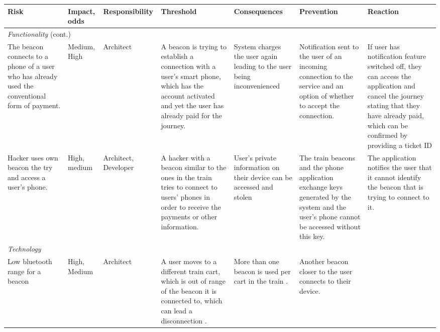 {
\renewcommand{\arraystretch}{1.2}
  \begin{sidewaystable}
    \begin{tabularx}{\textwidth}{XXXXXXX}
      \textbf{Risk} & \textbf{Impact, odds} & \textbf{Responsibility} & \textbf{Threshold} & \textbf{Consequences} & \textbf{Prevention} & \textbf{Reaction} \\ \hline
      \multicolumn{7}{l}{\textit{Functionality} (cont.)} \\ \hline
      The beacon connects to a phone of a user who has already used the conventional form of payment. & Medium, High & Architect & A beacon is trying to establish a connection with a user's smart phone, which has the account activated and yet the user has already paid for the journey. & System charges the user again leading to the user being inconvenienced & Notification sent to the user of an incoming connection to the service and an option of whether to accept the connection. & If user has notification feature switched off, they can access the application and cancel the journey stating that they have already paid, which can be confirmed by providing a ticket ID \\ \hline
      Hacker uses own beacon the try and access a user's phone. & High, medium & Architect, Developer & A hacker with a beacon similar to the ones in the train tries to connect to users' phones in order to receive the payments or other information. & User's private information on their device can be accessed and stolen & The train beacons and the phone application exchange keys generated by the system and the user's phone cannot be accessed without this key. & The application notifies the user that it cannot identify the beacon that is trying to connect to it. \\ \hline
      \multicolumn{7}{l}{\textit{Technology}} \\ \hline
      Low bluetooth range for a beacon & High, Medium & Architect & A user moves to a different train cart, which is out of range of the beacon it is connected to, which can lead a disconnection . & More than one beacon is used per cart in the train . & Another beacon closer to the user connects to their device. \\ \hline
    \end{tabularx}
  \end{sidewaystable}
}